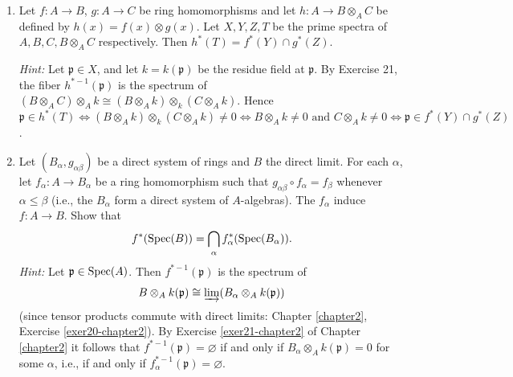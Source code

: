 \begin{enumerate}
    \item \label{exer25-chapter3}Let $f \colon A \to B$, $g \colon A \to C$ be ring homomorphisms and let $h \colon A \to B \otimes_A C$ be defined by $h(x) = f(x) \otimes g(x)$. Let $X, Y, Z, T$ be the prime spectra of $A, B, C, B \otimes_A C$ respectively. Then $h^*(T) = f^*(Y) \cap g^*(Z)$.
    
    \textit{Hint:} Let $\mathfrak{p} \in X$, and let $k = k(\mathfrak{p})$ be the residue field at $\mathfrak{p}$. By Exercise 21, the fiber $h^{*-1}(\mathfrak{p})$ is the spectrum of $(B \otimes_A C) \otimes_A k \cong (B \otimes_A k) \otimes_k (C \otimes_A k)$. Hence $\mathfrak{p} \in h^*(T) \iff (B \otimes_A k) \otimes_k (C \otimes_A k) \neq 0 \iff B \otimes_A k \neq 0 \text{ and } C \otimes_A k \neq 0 \iff \mathfrak{p} \in f^*(Y) \cap g^*(Z)$.

    \item \label{exer26-chapter3}Let $(B_\alpha, g_{\alpha\beta})$ be a direct system of rings and $B$ the direct limit. For each $\alpha$, let $f_\alpha \colon A \to B_\alpha$ be a ring homomorphism such that $g_{\alpha\beta} \circ f_\alpha = f_\beta$ whenever $\alpha \leq \beta$ (i.e., the $B_\alpha$ form a direct system of $A$-algebras). The $f_\alpha$ induce $f \colon A \to B$. Show that
    \[
    f^*(\operatorname{Spec}(B)) = \bigcap_\alpha f_\alpha^*(\operatorname{Spec}(B_\alpha)).
    \]
    \textit{Hint:} Let $\mathfrak{p} \in \operatorname{Spec}(A)$. Then $f^{*-1}(\mathfrak{p})$ is the spectrum of \[B \otimes_A k(\mathfrak{p}) \cong \varinjlim (B_\alpha \otimes_A k(\mathfrak{p}))\] (since tensor products commute with direct limits: Chapter \ref{chapter2}, Exercise \ref{exer20-chapter2}). By Exercise \ref{exer21-chapter2} of Chapter \ref{chapter2} it follows that $f^{*-1}(\mathfrak{p}) = \varnothing$ if and only if $B_\alpha \otimes_A k(\mathfrak{p}) = 0$ for some $\alpha$, i.e., if and only if $f_\alpha^{*-1}(\mathfrak{p}) = \varnothing$.


\end{enumerate}
